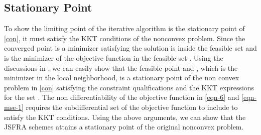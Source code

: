 \subsection{Stationary Point}

To show the limiting point of the iterative algorithm is the stationary point of \eqref{con}, it must satisfy the \ac{KKT} conditions of the nonconvex problem. Since the converged point is a minimizer satisfying
the solution is inside the feasible set  and  is the minimizer of the objective function  in the feasible set . Using the discussions in \cite{marks1978technical}, we can easily show that the feasible point  and , which is the minimizer in the local neighborhood, is a stationary point of the non convex problem in \eqref{con} satisfying the constraint qualifications and the \ac{KKT} expressions for the set . The non differentiability of the objective function in \eqref{eqn-6} and \eqref{eqn-mse-1} requires the subdifferential set of the objective function to include  to satisfy the \ac{KKT} conditions. Using the above arguments, we can show that the \ac{JSFRA} schemes attains a stationary point of the original nonconvex problem. 

